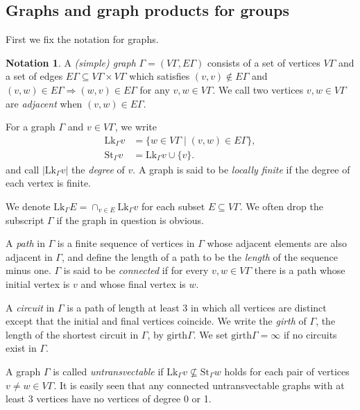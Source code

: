 \documentclass{amsart}
\theoremstyle{definition}
\newtheorem{notation}[theorem]{Notation}
\renewcommand{\subset}{\subseteq}
\begin{document}
\subsection{Graphs and graph products for groups}\label{chapgraph}

First we fix the notation for graphs. 

\begin{notation}
A \emph{(simple) graph} $\Gamma=(V\Gamma, E\Gamma)$ consists of a set of vertices $V\Gamma$ and a set of edges $E\Gamma\subset V\Gamma\times V\Gamma$ which satisfies $(v,v)\notin E\Gamma$ and $(v,w)\in E\Gamma \Longrightarrow (w,v)\in E\Gamma$ for any $v,w\in V\Gamma$. We call two vertices $v,w\in V\Gamma$ are \emph{adjacent} when $(v,w)\in E\Gamma$. 

For a graph $\Gamma$ and $v\in V\Gamma$, we write
\begin{align}
\mathrm{Lk}_{\Gamma}v &= \{ w\in V\Gamma \mid (v,w)\in E\Gamma \}, \\ 
\mathrm{St}_{\Gamma}v &= \mathrm{Lk}_{\Gamma}v\cup\{ v \}. 
\end{align}
and call $|\mathrm{Lk}_{\Gamma}v|$ the \emph{degree} of $v$. 
A graph is said to be \emph{locally finite} if the degree of each vertex is finite. 

We denote $\mathrm{Lk}_{\Gamma}E=\cap_{v\in E} \mathrm{Lk}_{\Gamma}v$ for each subset $E\subset V\Gamma$. 
We often drop the subscript $\Gamma$ if the graph in question is obvious. 
 
A \emph{path} in $\Gamma$ is a finite sequence of vertices in $\Gamma$ whose adjacent elements are also adjacent in $\Gamma$, and define the length of a path to be the \emph{length} of the sequence minus one.
$\Gamma$ is said to be \emph{connected} if for every $v,w\in V\Gamma$ there is a path whose initial vertex is $v$ and whose final vertex is $w$. 
 
A \emph{circuit} in $\Gamma$ is a path of length at least 3 in which all vertices are distinct except that the initial and final vertices coincide. We write the \emph{girth} of $\Gamma$, the length of the shortest circuit in $\Gamma$, by $\mathrm{girth}\Gamma$. We set $\mathrm{girth}\Gamma = \infty$ if no circuits exist in $\Gamma$. 

A graph $\Gamma$ is called \emph{untransvectable}
if $\mathrm{Lk}_{\Gamma}v \nsubseteq \mathrm{St}_{\Gamma}w $ holds for each pair of vertices $v\neq w\in V\Gamma$. 
It is easily seen that any connected untransvectable graphs with at least 3 vertices have no vertices of degree 0 or 1. 

\end{notation}
\end{document}
